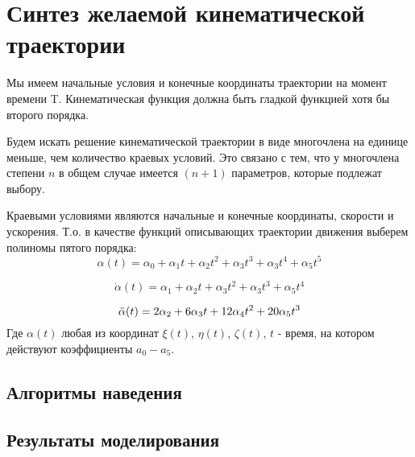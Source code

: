 \section{Синтез желаемой кинематической траектории}

Мы имеем начальные условия и конечные координаты траектории на момент времени T. Кинематическая функция должна быть гладкой функцией хотя бы второго порядка.

Будем искать решение кинематической траектории в виде многочлена на единице меньше, чем количество краевых условий. Это связано с тем, что у многочлена степени $n$ в общем случае имеется $(n + 1)$ параметров, которые подлежат выбору. 

Краевыми условиями являются начальные и конечные координаты, скорости и ускорения. Т.о. в качестве функций описывающих траектории движения выберем полиномы пятого порядка:
\begin{equation}
	\alpha(t) = \alpha_0 + \alpha_1 t + \alpha_2 t^2 + \alpha_3 t^3 + \alpha_3 t^4 + \alpha_5 t^5 
	\label{eq:ur_traectorii}
\end{equation}

\begin{equation}
	\Dot{\alpha}(t) = \alpha_1 + \alpha_2 t + \alpha_3 t^2 + \alpha_3 t^3 + \alpha_5 t^4 
	\label{eq:ur_velocity}
\end{equation}

\begin{equation}
	\Ddot{\alpha}(t) = 2 \alpha_2 + 6 \alpha_3 t + 12 \alpha_4 t^2 + 20 \alpha_5 t^3
\end{equation}
Где $\alpha(t)$ любая из координат $\xi(t)$, $\eta(t)$, $\zeta(t)$, $t$ - время, на котором действуют коэффициенты $a_0-a_5$.
\clearpage

\subsection{Алгоритмы наведения}
\clearpage

\subsection{Результаты моделирования}
\clearpage